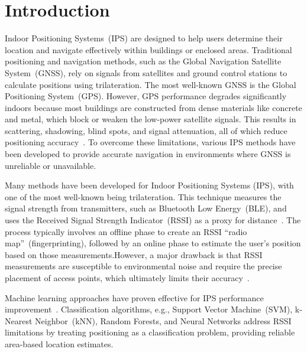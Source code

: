 \documentclass[runningheads]{llncs}
\begin{document}

\section{Introduction}\label{sec:introduction}

Indoor Positioning Systems~(IPS) are designed to help users determine their location and navigate effectively within buildings or enclosed areas. Traditional positioning and navigation methods, such as the Global Navigation Satellite System~(GNSS), rely on signals from satellites and ground control stations to calculate positions using trilateration. The most well-known GNSS is the Global Positioning System~(GPS). However, GPS performance degrades significantly indoors because most buildings are constructed from dense materials like concrete and metal, which block or weaken the low-power satellite signals. This results in scattering, shadowing, blind spots, and signal attenuation, all of which reduce positioning accuracy~\cite{bgp1}. To overcome these limitations, various IPS methods have been developed to provide accurate navigation in environments where GNSS is unreliable or unavailable.

Many methods have been developed for Indoor Positioning Systems (IPS), with one of the most well-known being trilateration. This technique measures the signal strength from transmitters, such as Bluetooth Low Energy~(BLE), and uses the Received Signal Strength Indicator~(RSSI) as a proxy for distance~\cite{bg2}. The process typically involves an offline phase to create an RSSI ``radio map''~(fingerprinting), followed by an online phase to estimate the user's position based on those measurements.However, a major drawback is that RSSI measurements are susceptible to environmental noise and require the precise placement of access points, which ultimately limits their accuracy~\cite{bgp2}.

Machine learning approaches have proven effective for IPS performance improvement~\cite{bgp3}. Classification algorithms, e.g., Support Vector Machine~(SVM), k-Nearest Neighbor~(kNN), Random Forests, and Neural Networks address RSSI limitations by treating positioning as a classification problem, providing reliable area-based location estimates.
\end{document}
